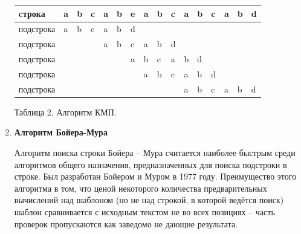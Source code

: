 \documentclass[a4paper,14pt]{article} %
\begin{document}
\begin{enumerate}
        \begin{center}
	\begin{tabular}{|l|l|l|l|l|l|l|l|l|l|l|l|l|l|l|l|}
	\hline
	cтрока    & a & b & c & a & b & e                         & a & b & c & a                         & b                         & c                         & a                         	& b                         & d                         \\ \hline
	подстрока & a & b & c & a & b & \cellcolor[HTML]{FE0000}d &   &   &   &                           &                           &                           	&                           &                           &                           \\ \hline
	подстрока &   &   &   & a & b & \cellcolor[HTML]{FE0000}c & a & b & d &                           &                           &                           	&                           &                           &                           \\ \hline
	подстрока &   &   &   &   &   & \cellcolor[HTML]{FE0000}a & b & c & a & b                         & d                         &                           	&                           &                           &                           \\ \hline
	подстрока &   &   &   &   &   &                           & a & b & c & a                         & b                         & \cellcolor[HTML]{FE0000}d &                           &                           &                           \\ \hline
	подстрока &   &   &   &   &   &                           &   &   &   & \cellcolor[HTML]{34FF34}a & \cellcolor[HTML]{34FF34}b & 	\cellcolor[HTML]{34FF34}c & \cellcolor[HTML]{34FF34}a & \cellcolor[HTML]{34FF34}b & \cellcolor[HTML]{34FF34}d 	\\ \hline
	\end{tabular}
	
	Таблица 2.
	Алгоритм КМП.  
	\end{center}
        
        
        \item \textbf{Алгоритм Бойера-Мура}
        
        Алгоритм поиска строки Бойера -- Мура считается наиболее быстрым среди алгоритмов общего назначения, предназначенных для поиска подстроки в строке. Был разработан Бойером и Муром в 1977 году. Преимущество этого алгоритма в том, что ценой некоторого количества предварительных вычислений над шаблоном (но не над строкой, в которой ведётся поиск) шаблон сравнивается с исходным текстом не во всех позициях -- часть проверок пропускаются как заведомо не дающие результата.
        

\end{enumerate}
\end{document}
